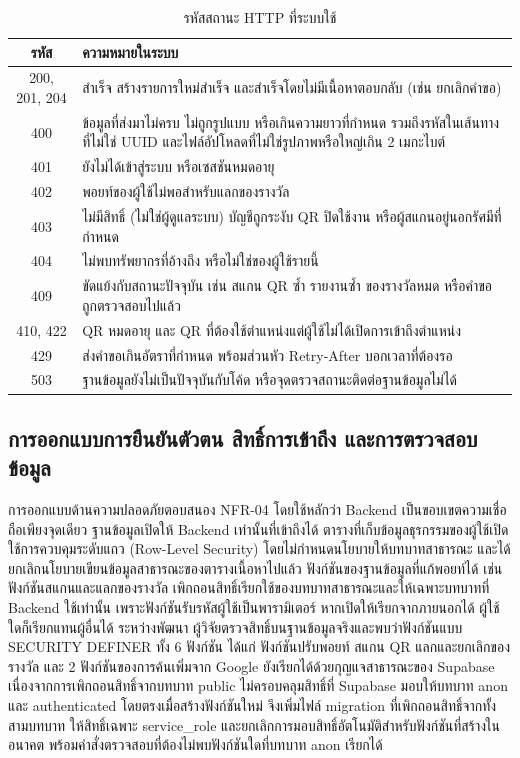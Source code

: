 \nopagebreak
\begin{table}[H]
\centering
\caption{รหัสสถานะ HTTP ที่ระบบใช้}
\label{tab:http_status}
\begin{tabular}{|c|p{11.5cm}|}
\hline
\textbf{รหัส} & \textbf{ความหมายในระบบ} \\
\hline
200, 201, 204 & สำเร็จ สร้างรายการใหม่สำเร็จ และสำเร็จโดยไม่มีเนื้อหาตอบกลับ (เช่น ยกเลิกคำขอ) \\ \hline
400 & ข้อมูลที่ส่งมาไม่ครบ ไม่ถูกรูปแบบ หรือเกินความยาวที่กำหนด รวมถึงรหัสในเส้นทางที่ไม่ใช่ UUID และไฟล์อัปโหลดที่ไม่ใช่รูปภาพหรือใหญ่เกิน 2 เมกะไบต์ \\ \hline
401 & ยังไม่ได้เข้าสู่ระบบ หรือเซสชันหมดอายุ \\ \hline
402 & พอยท์ของผู้ใช้ไม่พอสำหรับแลกของรางวัล \\ \hline
403 & ไม่มีสิทธิ์ (ไม่ใช่ผู้ดูแลระบบ) บัญชีถูกระงับ QR ปิดใช้งาน หรือผู้สแกนอยู่นอกรัศมีที่กำหนด \\ \hline
404 & ไม่พบทรัพยากรที่อ้างถึง หรือไม่ใช่ของผู้ใช้รายนี้ \\ \hline
409 & ขัดแย้งกับสถานะปัจจุบัน เช่น สแกน QR ซ้ำ รายงานซ้ำ ของรางวัลหมด หรือคำขอถูกตรวจสอบไปแล้ว \\ \hline
410, 422 & QR หมดอายุ และ QR ที่ต้องใช้ตำแหน่งแต่ผู้ใช้ไม่ได้เปิดการเข้าถึงตำแหน่ง \\ \hline
429 & ส่งคำขอเกินอัตราที่กำหนด พร้อมส่วนหัว Retry-After บอกเวลาที่ต้องรอ \\ \hline
503 & ฐานข้อมูลยังไม่เป็นปัจจุบันกับโค้ด หรือจุดตรวจสถานะติดต่อฐานข้อมูลไม่ได้ \\
\hline
\end{tabular}
\end{table}

\subsection{การออกแบบการยืนยันตัวตน สิทธิ์การเข้าถึง และการตรวจสอบข้อมูล}

การออกแบบด้านความปลอดภัยตอบสนอง NFR-04 โดยใช้หลักว่า Backend เป็นขอบเขตความเชื่อถือเพียงจุดเดียว ฐานข้อมูลเปิดให้ Backend เท่านั้นที่เข้าถึงได้ ตารางที่เก็บข้อมูลธุรกรรมของผู้ใช้เปิดใช้การควบคุมระดับแถว (Row-Level Security) โดยไม่กำหนดนโยบายให้บทบาทสาธารณะ และได้ยกเลิกนโยบายเขียนข้อมูลสาธารณะของตารางเนื้อหาไปแล้ว ฟังก์ชันของฐานข้อมูลที่แก้พอยท์ได้ เช่น ฟังก์ชันสแกนและแลกของรางวัล เพิกถอนสิทธิ์เรียกใช้ของบทบาทสาธารณะและให้เฉพาะบทบาทที่ Backend ใช้เท่านั้น เพราะฟังก์ชันรับรหัสผู้ใช้เป็นพารามิเตอร์ หากเปิดให้เรียกจากภายนอกได้ ผู้ใช้ใดก็เรียกแทนผู้อื่นได้ ระหว่างพัฒนา ผู้วิจัยตรวจสิทธิ์บนฐานข้อมูลจริงและพบว่าฟังก์ชันแบบ SECURITY DEFINER ทั้ง 6 ฟังก์ชัน ได้แก่ ฟังก์ชันปรับพอยท์ สแกน QR แลกและยกเลิกของรางวัล และ 2 ฟังก์ชันของการค้นเพิ่มจาก Google ยังเรียกได้ด้วยกุญแจสาธารณะของ Supabase เนื่องจากการเพิกถอนสิทธิ์จากบทบาท public ไม่ครอบคลุมสิทธิ์ที่ Supabase มอบให้บทบาท anon และ authenticated โดยตรงเมื่อสร้างฟังก์ชันใหม่ จึงเพิ่มไฟล์ migration ที่เพิกถอนสิทธิ์จากทั้งสามบทบาท ให้สิทธิ์เฉพาะ service\_role และยกเลิกการมอบสิทธิ์อัตโนมัติสำหรับฟังก์ชันที่สร้างในอนาคต พร้อมคำสั่งตรวจสอบที่ต้องไม่พบฟังก์ชันใดที่บทบาท anon เรียกได้

